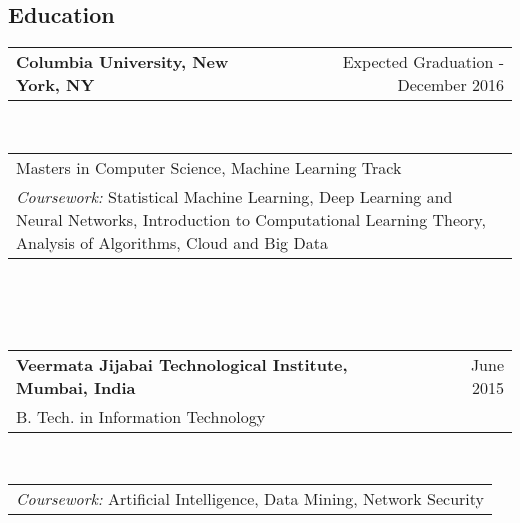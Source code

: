 \documentclass[margin,line]{res}
\begin{document}
\address {sm4083@columbia.edu $\mid$ 929-373-8678 $\mid$ 567 West 125th St. New York NY 10027}
\begin{resume}

\section{\sc\bf Education}
\begin{tabular}{p{3.41in}  r}
\bf Columbia University, New York, NY & Expected Graduation - December 2016
\end{tabular}
\\
\begin{tabular}{p{5.92in}}
Masters in Computer Science, Machine Learning Track\\
\textit{Coursework:} Statistical Machine Learning, Deep Learning and Neural Networks, Introduction to Computational Learning Theory, Analysis of Algorithms, Cloud and Big Data
\end{tabular}
\\\\\\
\begin{tabular}{p{5.136in} r}
\bf Veermata Jijabai Technological Institute, Mumbai, India & June 2015\\
B. Tech. in Information Technology 
\end{tabular}
\\
\begin{tabular}{p{5.92in}}
\textit{Coursework:} Artificial Intelligence, Data Mining, Network Security
\end{tabular}


\end{resume}
\end{document}
